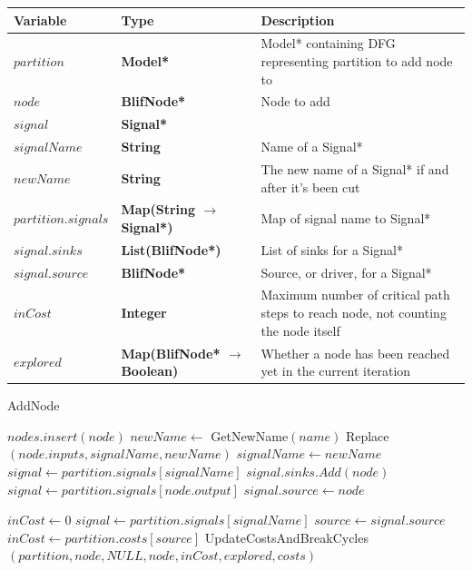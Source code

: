 \documentclass[12pt,final,oneside]{dwThesis} %
\begin{document}
   \begin{algorithm}
      \begin{center}
         \begin{tabularx}{\linewidth}{llX}
            \toprule
            Variable & Type & Description\\
            \midrule
            $partition$ &\textbf{  Model* } &  Model* containing DFG representing partition to add node to\\
            $node$ &\textbf{  BlifNode* } &  Node to add\\
            $signal$ &\textbf{  Signal* } &  \\
            $signalName$ &\textbf{ String } &  Name of a Signal*\\
            $newName$ &\textbf{ String } &  The new name of a Signal* if and after it's been cut\\
            $partition.signals$ &\textbf{  Map(String $\to$ Signal*) } &  Map of signal name to Signal* \\
            $signal.sinks$ &\textbf{  List(BlifNode*) } &  List of sinks for a Signal* \\
            $signal.source$ &\textbf{  BlifNode* } &  Source, or driver, for a Signal* \\
            $inCost$ &\textbf{ Integer } &  Maximum number of critical path steps to reach node, not counting the node itself \\
            $explored$ &\textbf{  Map(BlifNode* $\to$ Boolean) } &  Whether a node has been reached yet in the current iteration \\ 
            \bottomrule
         \end{tabularx}
      \end{center}
      \caption{AddNode}\label{addnode}
      \begin{algorithmic}[1]
         \State $nodes.insert(node)$
             \State $newName \gets$ GetNewName$(name)$ 
             \State Replace$(node.inputs, signalName, newName)$ 
             \State $signalName \gets newName$
         \EndIf
         \State $signal \gets partition.signals[signalName]$
         \State $signal.sinks.Add(node)$
         \EndFor
         \State $signal \gets partition.signals[node.output]$
         \State $signal.source \gets node$

         \State $inCost \gets 0$
         \State $signal \gets partition.signals[signalName]$
         \State $source \gets signal.source$
         \State $inCost \gets partition.costs[source]$
         \EndIf
         \EndFor
         \State UpdateCostsAndBreakCycles$(partition, node, NULL, node, inCost, explored, costs)$
         \EndProcedure
      \end{algorithmic}
   \end{algorithm}
\end{document}
